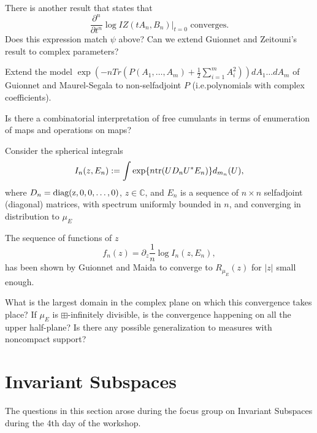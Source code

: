 \documentclass[12pt,letterpaper, reqno]{amsart}
\begin{document}
\begin{problem}
 There is another result that states that \[
\frac{\partial^{n}}{\partial t^{n}}\log IZ(tA_{n},B_{n})\vert_{t=0}\textrm{ converges.}\]
 Does this expression match $\psi$ above? Can we extend Guionnet
and Zeitouni's result to complex parameters?\end{problem}

\begin{problem}
Extend the model $\exp(-nTr(P(A_{1},\ldots,A_{m})+\frac{1}{2}\sum_{i=1}^{m}A_{i}^{2}))dA_{1}\ldots dA_{m}$
of Guionnet and Maurel-Segala to non-selfadjoint $P$ (i.e.polynomials
with complex coefficients).
\end{problem}

\begin{problem}
 Is there a combinatorial interpretation of
free cumulants in terms of enumeration of maps and operations on maps?
\end{problem}

\begin{problemblock}
Consider the spherical integrals
$$I_n(z,E_n):=\int\exp\{n{\rm tr}(UD_nU^*E_n)\}d_{m_n}(U),$$
where $D_n={\rm diag(z,0,0,\dots,0)}$, $z\in\mathbb C$, and
$E_n$ is a sequence of $n\times n$ selfadjoint (diagonal) matrices,
with spectrum uniformly bounded in $n$, and  converging in distribution to
$\mu_E$

The sequence of functions of $z$
$$f_n(z)=\partial_z\frac1n\log I_n(z,E_n),$$
has been shown by Guionnet and Maida to converge to $R_{\mu_E}(z)$ for
$|z|$ small enough.
\begin{problem}
 What is the largest domain in the complex plane on which
this convergence takes place? If $\mu_E$ is $\boxplus$-infinitely
divisible, is the convergence happening on all the upper half-plane? Is there any possible generalization to measures with noncompact support?
\end{problem}
\begin{comment}One could probably approach this problem by trying to study the normality
of the family/sequence $f_n$.
\end{comment}
\end{problemblock}

\section{Invariant Subspaces}
The questions in this section arose during the focus group on
Invariant Subspaces during the 4th day of the workshop.
\end{document}
